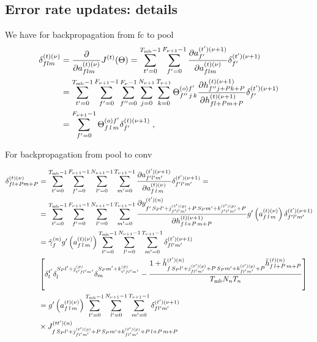 \begin{subappendices}
\section{Error rate updates: details} \label{sec:appenderrorrate}

We have for backpropagation from fc to pool
\begin{align}
\delta^{(t)(\nu)}_{flm}&= \frac{\partial }{\partial a_{flm}^{(t)(\nu)}}J^{(t)}(\Theta)=
%
\sum_{t'=0}^{T_{{\rm mb}}-1}\sum_{f'=0}^{F_{\nu+1}-1}
%
 \frac{\partial a_{f'}^{(t')(\nu+1)}}{\partial a_{flm}^{(t)(\nu)}} \delta^{(t')(\nu+1)}_{f'}\notag\\
%
&=\sum_{t'=0}^{T_{{\rm mb}}-1}\sum_{f'=0}^{F_{\nu+1}-1}\sum^{F_\nu-1}_{f''=0}
%
\sum^{N_{\nu+1}}_{j=0}\sum^{T_{\nu+1}}_{k=0}\Theta^{(o)f'}_{f''\,j\,k}
%
\frac{\partial h^{(t)(\nu+1)}_{f''j+Pk+P} }{\partial h_{fl+Pm+P}^{(t)(\nu+1)}} \delta^{(t')(\nu+1)}_{f'}\notag\\
%
&=\sum_{f'=0}^{F_{\nu+1}-1}\Theta^{(o)f'}_{f\,l\,m} \delta^{(t)(\nu+1)}_{f'}\;,
\end{align}

For backpropagation from pool to conv

\begin{align}
\delta^{(t)(\nu)}_{fl+Pm+P}&=
%
\sum_{t'=0}^{T_{{\rm mb}}-1}\sum^{F_{\nu+1}-1}_{f'=0}\sum^{N_{\nu+1}-1}_{l'=0}\sum^{T_{\nu+1}-1}_{m'=0}
%
\frac{\partial a_{f'l'm'}^{(t')(\nu+1)}}{\partial a_{f\,l\,m}^{(t)(\nu)}}
%
\delta_{f'l'm'}^{(t')(\nu+1)}
%
=\notag\\
%
&=\sum_{t'=0}^{T_{{\rm mb}}-1}\sum^{F_{\nu+1}-1}_{f'=0}\sum^{N_{\nu+1}-1}_{l'=0}\sum^{T_{\nu+1}-1}_{m'=0}
%
\frac{\partial y_{f'\,S_P l'+j_{f'l'm'}^{(t')(p)}+P\,S_Pm'+k_{f'l'm'}^{(t')(p)}+P}^{(t')(n)}}{\partial h_{f\,l+P\,m+P}^{(t)(\nu+1)}}
%
g'\left(a_{f\,l\,m}^{(t)(\nu)}\right)\delta_{f'l'm'}^{(t')(\nu+1)}\notag\\
%
&=\tilde{\gamma}^{(n)}_fg'\left(a_{f\,l\,m}^{(t)(\nu)}\right)
%
\sum_{t'=0}^{T_{{\rm mb}}-1}\sum^{N_{\nu+1}-1}_{l'=0}\sum^{T_{\nu+1}-1}_{m'=0}\delta_{fl'm'}^{(t')(\nu+1)}\notag\\
%
&\left[\delta^{t'}_t\delta^{S_P l'+j_{t'fl'm'}^{(p)}}_l\delta^{S_Pm'+k_{t'fl'm'}^{(p)}}_m-
%
\frac{1+\tilde{h}_{f\,S_P l'+j_{fl'm'}^{(t')(p)}+P\,S_Pm'+k_{fl'm'}^{(t')(p)}+P}^{(t')(n)}\tilde{h}_{f\,l+P\,m+P}^{(t)(n)}}{T_{{\rm mb}}N_{n}T_{n}}\right]\notag\\
%
&=g'\left(a_{f\,l\,m}^{(t)(\nu)}\right)\sum_{t'=0}^{T_{{\rm mb}}-1}\sum^{N_{\nu+1}-1}_{l'=0}
%
\sum^{T_{\nu+1}-1}_{m'=0}\delta_{fl'm'}^{(t')(\nu+1)}\notag\\
%
&\times J^{(tt')(n)}_{f\,S_P l'+j_{fl'm'}^{(t')(p)}+P\,S_Pm'+k_{fl'm'}^{(t')(p)}+P\,l+P\,m+P}
\end{align}


\end{subappendices}
